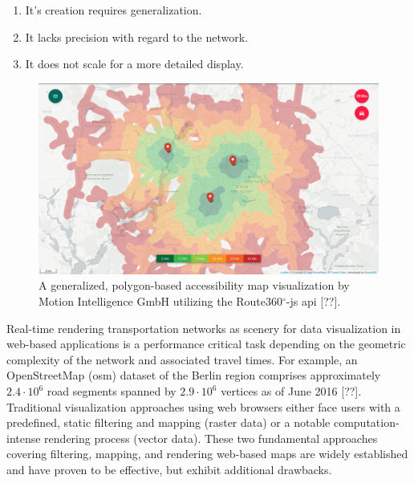     \begin{enumerate}[\label=({D}1)]
      \item \label{enu:drawb:d1} It's creation requires generalization.
      \item \label{enu:drawb:d2} It lacks precision with regard to the network.
      \item \label{enu:drawb:d3} It does not scale for a more detailed display.
    \end{enumerate}

    \begin{figure}[htb]
      \centering
      \includegraphics[width=\linewidth]
        {./img/screenshot-r360js-demo.png}
      \caption{A generalized, polygon-based accessibility map visualization
        by Motion Intelligence GmbH utilizing the Route360$^\circ$-\acrshort{js}
        \acrshort{api} [??].}
      \label{fig:intro:r360d}
    \end{figure}

    Real-time rendering transportation networks as scenery for data
    visualization in web-based applications is a performance critical task
    depending on the geometric complexity of the network and associated travel
    times. For example, an OpenStreetMap (\acrshort{osm}) dataset of the Berlin
    region comprises approximately $2.4 \cdot 10^6$ road segments spanned by
    $2.9 \cdot 10^6$ vertices as of June 2016 [??]. Traditional visualization
    approaches using web browsers either face users with a predefined, static
    filtering and mapping (raster data) or a notable computation-intense
    rendering process (vector data). These two fundamental approaches covering
    filtering, mapping, and rendering web-based maps are widely established and
    have proven to be effective, but exhibit additional drawbacks.\par

